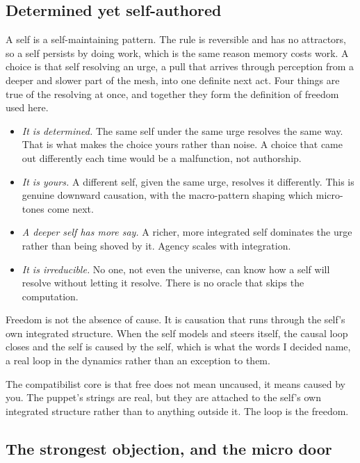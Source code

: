 \subsection{Determined yet self-authored}

A self is a self-maintaining pattern. The rule is reversible and has no attractors, so a self persists by doing
work, which is the same reason memory costs work. A choice is that self resolving an urge, a pull that arrives
through perception from a deeper and slower part of the mesh, into one definite next act. Four things are true of
the resolving at once, and together they form the definition of freedom used here.

\begin{itemize}
  \item \emph{It is determined.} The same self under the same urge resolves the same way. That is what makes the
  choice yours rather than noise. A choice that came out differently each time would be a malfunction, not
  authorship.
  \item \emph{It is yours.} A different self, given the same urge, resolves it differently. This is genuine
  downward causation, with the macro-pattern shaping which micro-tones come next.
  \item \emph{A deeper self has more say.} A richer, more integrated self dominates the urge rather than being
  shoved by it. Agency scales with integration.
  \item \emph{It is irreducible.} No one, not even the universe, can know how a self will resolve without letting
  it resolve. There is no oracle that skips the computation.
\end{itemize}

\begin{principle}
Freedom is not the absence of cause. It is causation that runs through the self's own integrated structure. When
the self models and steers itself, the causal loop closes and the self is caused by the self, which is what the
words I decided name, a real loop in the dynamics rather than an exception to them.
\end{principle}

The compatibilist core is that free does not mean uncaused, it means caused by you. The puppet's strings are real,
but they are attached to the self's own integrated structure rather than to anything outside it. The loop is the
freedom.

\subsection{The strongest objection, and the micro door}

